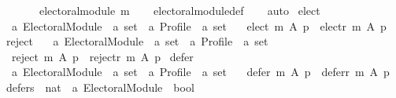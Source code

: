 \begin{isabellebody}
\ \ \ \ \ \ \ electoral{\isacharunderscore}{\kern0pt}module\ m{\isacharparenright}{\kern0pt}{\isachardoublequoteclose}\isanewline
%
\isadelimproof
\ \ %
\endisadelimproof
%
\isatagproof
{}\isamarkupfalse%
\ electoral{\isacharunderscore}{\kern0pt}module{\isacharunderscore}{\kern0pt}def\isanewline
\ \ \isamarkupfalse%
\ auto%
\endisatagproof
{\isafoldproof}%
%
\isadelimproof
\isanewline
%
\endisadelimproof
\isanewline
\isanewline
{}\isamarkupfalse%
\ elect\ {\isacharcolon}{\kern0pt}{\isacharcolon}{\kern0pt}\isanewline
\ \ {\isachardoublequoteopen}{\isacharprime}{\kern0pt}a\ Electoral{\isacharunderscore}{\kern0pt}Module\ {\isasymRightarrow}\ {\isacharprime}{\kern0pt}a\ set\ {\isasymRightarrow}\ {\isacharprime}{\kern0pt}a\ Profile\ {\isasymRightarrow}\ {\isacharprime}{\kern0pt}a\ set{\isachardoublequoteclose}\ \isanewline
\ \ {\isachardoublequoteopen}elect\ m\ A\ p\ {\isasymequiv}\ elect{\isacharunderscore}{\kern0pt}r\ {\isacharparenleft}{\kern0pt}m\ A\ p{\isacharparenright}{\kern0pt}{\isachardoublequoteclose}\isanewline
\isanewline
{}\isamarkupfalse%
\ reject\ {\isacharcolon}{\kern0pt}{\isacharcolon}{\kern0pt}\isanewline
\ \ {\isachardoublequoteopen}{\isacharprime}{\kern0pt}a\ Electoral{\isacharunderscore}{\kern0pt}Module\ {\isasymRightarrow}\ {\isacharprime}{\kern0pt}a\ set\ {\isasymRightarrow}\ {\isacharprime}{\kern0pt}a\ Profile\ {\isasymRightarrow}\ {\isacharprime}{\kern0pt}a\ set{\isachardoublequoteclose}\ \isanewline
\ \ {\isachardoublequoteopen}reject\ m\ A\ p\ {\isasymequiv}\ reject{\isacharunderscore}{\kern0pt}r\ {\isacharparenleft}{\kern0pt}m\ A\ p{\isacharparenright}{\kern0pt}{\isachardoublequoteclose}\isanewline
\isanewline
{}\isamarkupfalse%
\ {\isachardoublequoteopen}defer{\isachardoublequoteclose}\ {\isacharcolon}{\kern0pt}{\isacharcolon}{\kern0pt}\isanewline
\ \ {\isachardoublequoteopen}{\isacharprime}{\kern0pt}a\ Electoral{\isacharunderscore}{\kern0pt}Module\ {\isasymRightarrow}\ {\isacharprime}{\kern0pt}a\ set\ {\isasymRightarrow}\ {\isacharprime}{\kern0pt}a\ Profile\ {\isasymRightarrow}\ {\isacharprime}{\kern0pt}a\ set{\isachardoublequoteclose}\ \isanewline
\ \ {\isachardoublequoteopen}defer\ m\ A\ p\ {\isasymequiv}\ defer{\isacharunderscore}{\kern0pt}r\ {\isacharparenleft}{\kern0pt}m\ A\ p{\isacharparenright}{\kern0pt}{\isachardoublequoteclose}\isanewline
\isanewline
\isanewline
{}\isamarkupfalse%
\ defers\ {\isacharcolon}{\kern0pt}{\isacharcolon}{\kern0pt}\ {\isachardoublequoteopen}nat\ {\isasymRightarrow}\ {\isacharprime}{\kern0pt}a\ Electoral{\isacharunderscore}{\kern0pt}Module\ {\isasymRightarrow}\ bool{\isachardoublequoteclose}\ \isanewline

\end{isabellebody}
